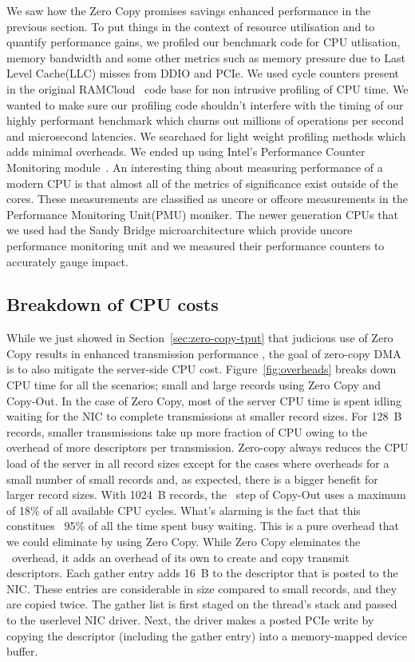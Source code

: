 We saw how the Zero Copy promises savings enhanced performance 
in the previous section. To put things in the context of resource utilisation and
 to quantify performance gains, we profiled our benchmark code for CPU utlisation, memory bandwidth 
 and some other metrics such as memory pressure due to Last Level Cache(LLC) misses from DDIO and PCIe.
We used cycle counters present in the original RAMCloud~\cite{ramcloud} code base for non intrusive profiling 
of CPU time.
We wanted to make sure our profiling code shouldn't interfere with the timing of our highly performant 
 benchmark which churns out millions of operations per second and microsecond latencies. 
 We searchaed for light weight profiling methods which adds minimal overheads.
 We ended up using Intel\textregistered's Performance Counter Monitoring module~\cite{intelpcm}. 
 An interesting thing about measuring performance 
 of a modern CPU is that almost all of the metrics of significance exist outside of the cores. These measurements 
 are classified as uncore or offcore measurements in the Performance Monitoring Unit(PMU) moniker.
 The newer generation CPUs that we used had the Sandy Bridge microarchitecture which provide uncore performance 
 monitoring unit and we measured their performance counters to accurately gauge impact.


\subsection{Breakdown of CPU costs}
\label{sec:overhead}

While we just showed in Section~\ref{sec:zero-copy-tput} that judicious use of Zero Copy results in enhanced transmission performance
, the goal of zero-copy DMA is to also mitigate the server-side CPU cost. Figure~\ref{fig:overheads} breaks down
CPU time for all the scenarios; small and large records using Zero Copy and Copy-Out. In the case 
of Zero Copy, most of the server CPU time is spent idling waiting for the NIC 
to complete transmissions at smaller record sizes. For 128~B records,
smaller transmissions take up more fraction of CPU owing to the overhead of more descriptors
per transmission. Zero-copy always reduces the CPU load of the server in all record sizes except for the cases where
overheads for a small number of small records and, as expected, there is a bigger
benefit for larger record sizes. 
With 1024~B records, the \memcpy ~step of Copy-Out uses a maximum of 18\% of all available
CPU cycles. What's alarming is the fact that this constitues ~95\% of all the time spent busy waiting.
This is a pure overhead that we could eliminate by using Zero Copy. While Zero Copy eleminates the \memcpy ~overhead, it adds an overhead of its own to create and copy transmit descriptors.
Each gather entry adds 16~B to the descriptor that is posted to the NIC.
These entries are considerable in size compared to
small records, and they are copied twice. The gather list
is first staged on the thread's stack and passed to the userlevel NIC driver. Next,
the driver makes a posted PCIe write by copying the descriptor (including the
gather entry) into a memory-mapped device buffer.






